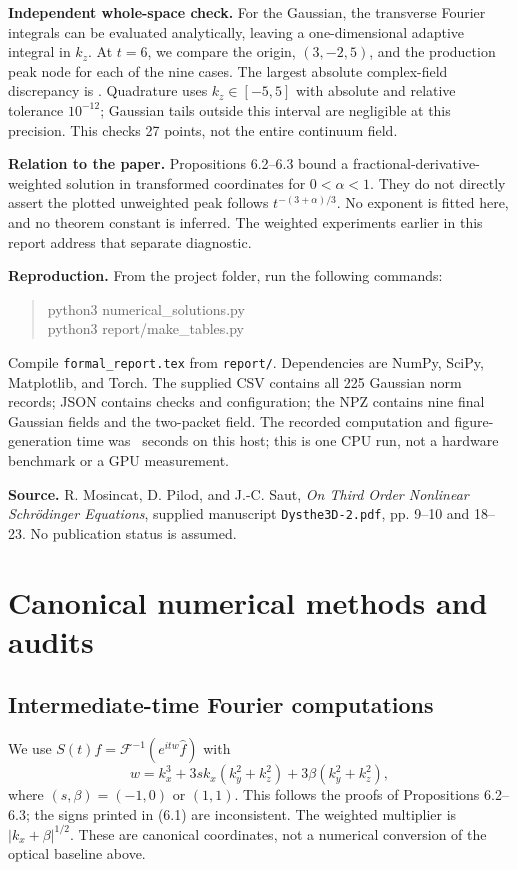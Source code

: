 \documentclass[10pt,letterpaper]{article}
\numberwithin{equation}{section}
\begin{document}
\textbf{Independent whole-space check.} For the Gaussian, the transverse Fourier
integrals can be evaluated analytically, leaving a one-dimensional adaptive integral
in $k_z$. At $t=6$, we compare the origin, $(3,-2,5)$, and the production peak node
for each of the nine cases. The largest absolute complex-field discrepancy is
\QuadError. Quadrature uses $k_z\in[-5,5]$ with absolute and relative tolerance
$10^{-12}$; Gaussian tails outside this interval are negligible at this precision.
This checks 27 points, not the entire continuum field.

\textbf{Relation to the paper.} Propositions 6.2--6.3 bound a fractional-derivative-weighted
solution in transformed coordinates for $0<\alpha<1$. They do not directly assert
the plotted unweighted peak follows $t^{-(3+\alpha)/3}$. No exponent is fitted here,
and no theorem constant is inferred. The weighted experiments earlier in this report address that separate diagnostic.

\textbf{Reproduction.} From the project folder, run the following commands:
\begin{quote}\small\ttfamily
python3 numerical\_solutions.py\\
python3 report/make\_tables.py
\end{quote}
Compile \texttt{formal\_report.tex} from \texttt{report/}. Dependencies are NumPy, SciPy, Matplotlib, and Torch.
The supplied CSV contains all 225 Gaussian norm records; JSON contains checks and
configuration; the NPZ contains nine final Gaussian fields and the two-packet field.
The recorded computation and figure-generation time was \Runtime\ seconds on this
host; this is one CPU run, not a hardware benchmark or a GPU measurement.

\textbf{Source.} R. Mosincat, D. Pilod, and J.-C. Saut,
\emph{On Third Order Nonlinear Schr\"odinger Equations}, supplied manuscript
\texttt{Dysthe3D-2.pdf}, pp. 9--10 and 18--23. No publication status is assumed.

\section{Canonical numerical methods and audits}

\subsection{Intermediate-time Fourier computations}\label{intermediate}
We use $S(t)f=\mathcal F^{-1}(e^{itw}\widehat f)$ with
\begin{equation}w=k_x^3+3s k_x(k_y^2+k_z^2)+3\beta(k_y^2+k_z^2),\end{equation}
where $(s,\beta)=(-1,0)$ or $(1,1)$. This follows the proofs of Propositions
6.2--6.3; the signs printed in (6.1) are inconsistent. The weighted multiplier is
$|k_x+\beta|^{1/2}$. These are canonical coordinates, not a numerical conversion
of the optical baseline above.
\end{document}
